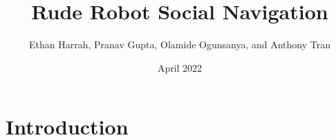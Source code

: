 \documentclass{article}
\title{Rude Robot Social Navigation}
\author{Ethan Harrah, Pranav Gupta, Olamide Ogunsanya, and Anthony Tran}
\date{April 2022}
\begin{document}
\maketitle

\section{Introduction}
\section{}
\end{document}
